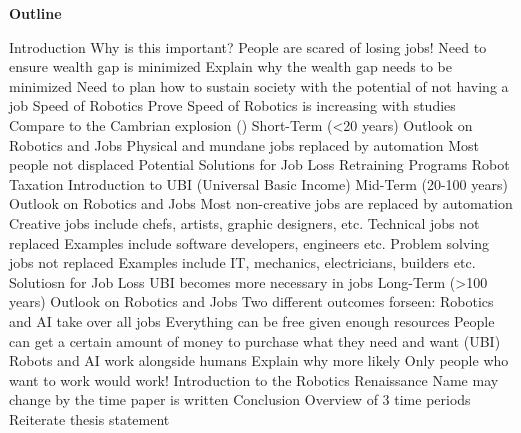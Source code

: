 \documentclass[12pt,letterpaper,man,natbib]{apa6}
\begin{document}
    \pagebreak
    \textbf{Outline}
    \begin{outline}[enumerate]
        \1 Introduction
            \2 Why is this important?
                \3 People are scared of losing jobs!
                \3 Need to ensure wealth gap is minimized
                    \4 Explain why the wealth gap needs to be minimized
                \3 Need to plan how to sustain society with the potential of not having a job
            \2 Speed of Robotics
                \3 Prove Speed of Robotics is increasing with studies
                \3 Compare to the Cambrian explosion (\cite{Cambrian})
        \1 Short-Term (<20 years)
            \2 Outlook on Robotics and Jobs
                \3 Physical and mundane jobs replaced by automation
                \3 Most people not displaced
            \2 Potential Solutions for Job Loss
                \3 Retraining Programs
                \3 Robot Taxation
                \3 Introduction to UBI (Universal Basic Income)
        \1 Mid-Term (20-100 years)
            \2 Outlook on Robotics and Jobs 
                \3 Most non-creative jobs are replaced by automation
                    \4 Creative jobs include chefs, artists, graphic designers, etc.
                \3 Technical jobs not replaced
                    \4 Examples include software developers, engineers etc.
                \3 Problem solving jobs not replaced
                    \4 Examples include IT, mechanics, electricians, builders etc.
            \2 Solutiosn for Job Loss
                \3 UBI becomes more necessary in jobs
                \3 
        \1 Long-Term (>100 years)
            \2 Outlook on Robotics and Jobs
                \3 Two different outcomes forseen:
                \3 Robotics and AI take over all jobs
                    \4 Everything can be free given enough resources
                    \4 People can get a certain amount of money to purchase what they need and want (UBI)
                \3 Robots and AI work alongside humans
                    \4 Explain why more likely
                    \4 Only people who want to work would work!
            \2 Introduction to the Robotics Renaissance
                \3 Name may change by the time paper is written
        \1 Conclusion
            \2 Overview of 3 time periods
            \2 Reiterate thesis statement
    \end{outline}

    
\end{document}
